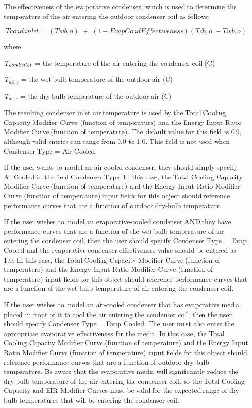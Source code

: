 The effectiveness of the evaporative condenser, which is used to determine the temperature of the air entering the outdoor condenser coil as follows:

\begin{equation}
Tcond\,inlet = \,\left( {Twb,o} \right)\,\, + \,\,\left( {1 - EvapCondEffectiveness} \right)\left( {Tdb,o\,\, - Twb,o} \right)
\end{equation}

where

\emph{T\(_{cond\\ inlet}\)} = the temperature of the air entering the condenser coil (C)

\emph{T\(_{wb,o}\)} = the wet-bulb temperature of the outdoor air (C)

\emph{T\(_{db,o}\)} = the dry-bulb temperature of the outdoor air (C)

The resulting condenser inlet air temperature is used by the Total Cooling Capacity Modifier Curve (function of temperature) and the Energy Input Ratio Modifier Curve (function of temperature). The default value for this field is 0.9, although valid entries can range from 0.0 to 1.0. This field is not used when Condenser Type = Air Cooled.

If the user wants to model an air-cooled condenser, they should simply specify AirCooled in the field Condenser Type. In this case, the Total Cooling Capacity Modifier Curve (function of temperature) and the Energy Input Ratio Modifier Curve (function of temperature) input fields for this object should reference performance curves that are a function of outdoor dry-bulb temperature.

If the user wishes to model an evaporative-cooled condenser AND they have performance curves that are a function of the wet-bulb temperature of air entering the condenser coil, then the user should specify Condenser Type = Evap Cooled and the evaporative condenser effectiveness value should be entered as 1.0. In this case, the Total Cooling Capacity Modifier Curve (function of temperature) and the Energy Input Ratio Modifier Curve (function of temperature) input fields for this object should reference performance curves that are a function of the wet-bulb temperature of air entering the condenser coil.

If the user wishes to model an air-cooled condenser that has evaporative media placed in front of it to cool the air entering the condenser coil, then the user should specify Condenser Type = Evap Cooled. The user must also enter the appropriate evaporative effectiveness for the media. In this case, the Total Cooling Capacity Modifier Curve (function of temperature) and the Energy Input Ratio Modifier Curve (function of temperature) input fields for this object should reference performance curves that are a function of outdoor dry-bulb temperature. Be aware that the evaporative media will significantly reduce the dry-bulb temperature of the air entering the condenser coil, so the Total Cooling Capacity and EIR Modifier Curves must be valid for the expected range of dry-bulb temperatures that will be entering the condenser coil.

